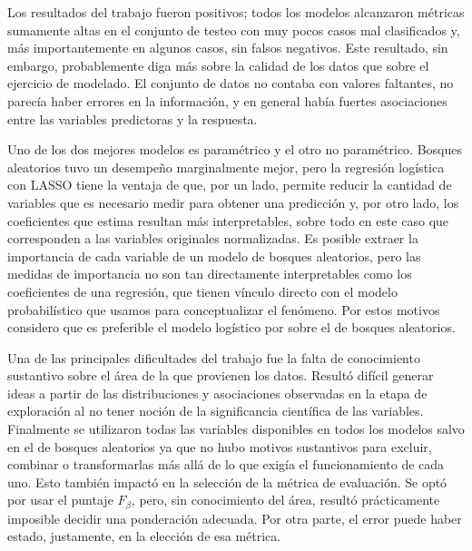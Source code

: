 
Los resultados del trabajo fueron positivos; todos los modelos alcanzaron
métricas sumamente altas en el conjunto de testeo con muy pocos casos mal
clasificados y, más importantemente en algunos casos, sin falsos negativos.
Este resultado, sin embargo, probablemente diga más sobre la calidad de los
datos que sobre el ejercicio de modelado. El conjunto de datos no contaba con
valores faltantes, no parecía haber errores en la información, y en general
había fuertes asociaciones entre las variables predictoras y la respuesta.

Uno de los dos mejores modelos es paramétrico y el otro no paramétrico. Bosques
aleatorios tuvo un desempeño marginalmente mejor, pero la regresión logística
con LASSO tiene la ventaja de que, por un lado, permite reducir la cantidad de
variables que es necesario medir para obtener una predicción y, por otro lado,
los coeficientes que estima resultan más interpretables, sobre todo en este
caso que corresponden a las variables originales normalizadas. Es posible
extraer la importancia de cada variable de un modelo de bosques aleatorios,
pero las medidas de importancia no son tan directamente interpretables como los
coeficientes de una regresión, que tienen vínculo directo con el modelo
probabilístico que usamos para conceptualizar el fenómeno. Por estos motivos
considero que es preferible el modelo logístico por sobre el de bosques
aleatorios.

Una de las principales dificultades del trabajo fue la falta de conocimiento
sustantivo sobre el área de la que provienen los datos. Resultó difícil generar
ideas a partir de las distribuciones y asociaciones observadas en la etapa de
exploración al no tener noción de la significancia científica de las variables.
Finalmente se utilizaron todas las variables disponibles en  todos los modelos
salvo en el de bosques aleatorios ya que no hubo motivos sustantivos para
excluir, combinar o transformarlas más allá de lo que exigía el funcionamiento
de cada uno. Esto también impactó en la selección de la métrica de evaluación.
Se optó por usar el puntaje $F_\beta$, pero, sin conocimiento del área, resultó
prácticamente imposible decidir una ponderación adecuada. Por otra parte, el
error puede haber estado, justamente, en la elección de esa métrica.
